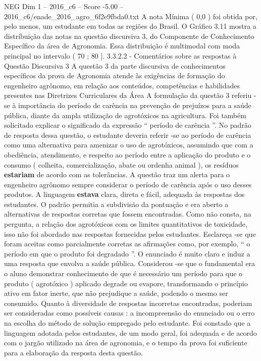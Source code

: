 \begin{textsample}{NEG Dim 1 – 2016\_c6 – Score -5.00 – 2016\_c6/enade\_2016\_agro\_6f2e9fbda0.txt}
A nota Mínima ( 0,0 ) foi obtida por, pelo menos, um estudante em todas as regiões do Brasil.
O Gráfico 3.11 mostra a distribuição das notas na questão discursiva 3, do Componente de Conhecimento Específico da área de Agronomia.
Essa distribuição é multimodal com moda principal no intervalo ( 70 ; 80 ]. 3.3.2.2 - Comentários sobre as respostas à Questão Discursiva 3 A questão 3 da parte discursiva de conhecimentos específicos da prova de Agronomia atende às exigências de formação do engenheiro agrônomo, em relação aos conteúdos, competências e habilidades presentes nas Diretrizes Curriculares da Área A formulação da questão 3 referiu -se à importância do período de carência na prevenção de prejuízos para a saúde pública, diante da ampla utilização de agrotóxicos na agricultura.
Foi também solicitado explicar o significado da expressão “ período de carência ”.
No padrão de resposta dessa questão, o estudante deveria referir -se ao período de carência como uma alternativa para amenizar o uso de agrotóxicos, assumindo que com a obediência, atendimento, e respeito ao período entre a aplicação do produto e o consumo ( colheita, comercialização, abate ou ordenha animal ), os resíduos \textbf{estariam} de acordo com as tolerâncias.
A questão traz um alerta para o engenheiro agrônomo sempre considerar o período de carência após o uso desses produtos.
A linguagem \textbf{estava} clara, direta e fácil, adequada às respostas dos estudantes.
O padrão permitia a subdivisão da pontuação e era aberto a alternativas de respostas corretas que fossem encontradas.
Como não consta, na pergunta, a relação dos agrotóxicos com os limites quantitativos de toxicidade, isso não foi abordado nas respostas fornecidas pelos estudantes.
Esclareça -se que foram aceitas como parcialmente corretas as afirmações como, por exemplo, “ o período em que o produto foi degradado ”.
O enunciado é muito claro e induz a uma resposta que envolva a saúde pública.
Considerou -se que o fundamental era o aluno demonstrar conhecimento de que é necessário um período para que o produto ( agrotóxico ) aplicado degrade ou evapore, transformando o princípio ativo em fator inerte, que não prejudique a saúde, podendo o mesmo ser consumido.
Quanto à diversidade de respostas incorretas encontradas, poderiam ser consideradas como possíveis causas : a incompreensão do enunciado ou o erro na escolha do método de solução empregado pelo estudante.
Foi constado que a linguagem adotada pelos estudantes, de um modo geral, foi adequada e de acordo com o jargão utilizado na área de agronomia, e o tempo da prova foi suficiente para a elaboração da resposta desta questão.

\end{textsample}
